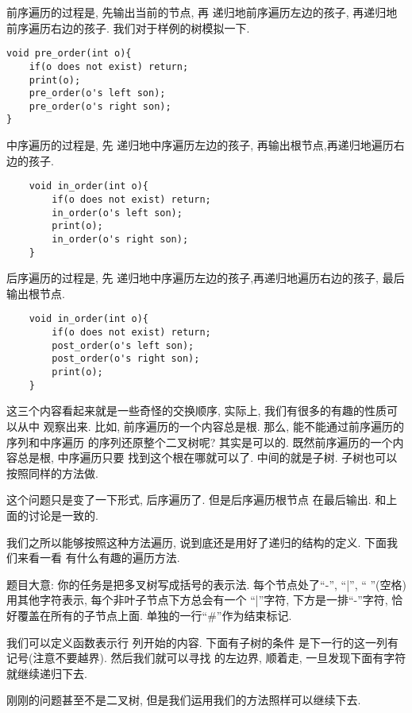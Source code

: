  前序遍历的过程是, 先输出当前的节点, 再
递归地前序遍历左边的孩子, 再递归地前序遍历右边的孩子. 我们对于样例的树模拟一下. 
\begin{lstlisting}
void pre_order(int o){
    if(o does not exist) return;
    print(o);
    pre_order(o's left son);
    pre_order(o's right son);
}
\end{lstlisting}

 中序遍历的过程是, 先
递归地中序遍历左边的孩子, 再输出根节点,再递归地遍历右边的孩子. 
\begin{lstlisting}
    void in_order(int o){
        if(o does not exist) return;
        in_order(o's left son);
        print(o);
        in_order(o's right son);
    }
\end{lstlisting}

 后序遍历的过程是, 先
递归地中序遍历左边的孩子,再递归地遍历右边的孩子, 最后输出根节点. 
\begin{lstlisting}
    void in_order(int o){
        if(o does not exist) return;
        post_order(o's left son);
        post_order(o's right son);
        print(o);
    }
\end{lstlisting}

这三个内容看起来就是一些奇怪的交换顺序, 实际上, 我们有很多的有趣的性质可以从中
观察出来. 比如, 前序遍历的一个内容总是根. 那么, 能不能通过前序遍历的序列和中序遍历
的序列还原整个二叉树呢? 其实是可以的. 既然前序遍历的一个内容总是根, 中序遍历只要
找到这个根在哪就可以了. 中间的就是子树. 子树也可以按照同样的方法做. 

 这个问题只是变了一下形式, 后序遍历了. 但是后序遍历根节点
在最后输出. 和上面的讨论是一致的. 

我们之所以能够按照这种方法遍历, 说到底还是用好了递归的结构的定义. 下面我们来看一看
有什么有趣的遍历方法. 

 题目大意: 你的任务是把多叉树写成括号的表示法. 
每个节点处了``-'', ``|'', `` ''(空格)用其他字符表示, 每个非叶子节点下方总会有一个
``|''字符, 下方是一排``-''字符, 恰好覆盖在所有的子节点上面. 单独的一行``\#''作为结束标记.

我们可以定义函数表示行 列开始的内容. 下面有子树的条件
是下一行的这一列有\cw{|}记号(注意不要越界). 然后我们就可以寻找\cw{-} 的左边界, 
顺着\cw{-}走, 一旦发现下面有字符就继续递归下去. 

刚刚的问题甚至不是二叉树, 但是我们运用我们的方法照样可以继续下去. 

